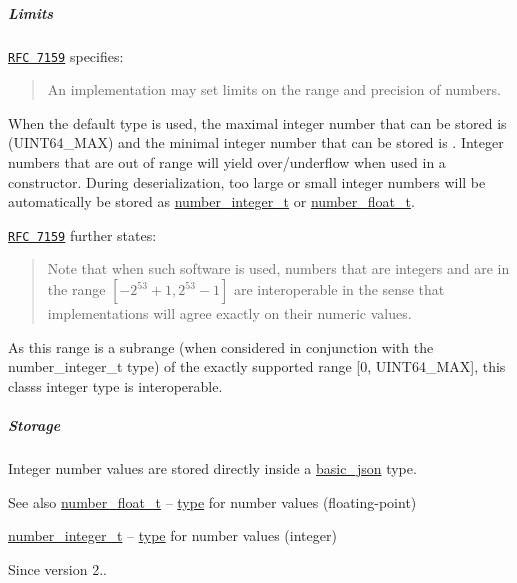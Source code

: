\subparagraph*{Limits}

\href{http://rfc7159.net/rfc7159}{\tt R\+FC 7159} specifies\+: \begin{quote}
An implementation may set limits on the range and precision of numbers. \end{quote}


When the default type is used, the maximal integer number that can be stored is {} (U\+I\+N\+T64\+\_\+\+M\+AX) and the minimal integer number that can be stored is {}. Integer numbers that are out of range will yield over/underflow when used in a constructor. During deserialization, too large or small integer numbers will be automatically be stored as \hyperlink{classnlohmann_1_1basic__json_a11e390944da90db83089eb2426a749d3}{number\+\_\+integer\+\_\+t} or \hyperlink{classnlohmann_1_1basic__json_a5b8abaebd922d82d69756327c0c347e6}{number\+\_\+float\+\_\+t}.

\href{http://rfc7159.net/rfc7159}{\tt R\+FC 7159} further states\+: \begin{quote}
Note that when such software is used, numbers that are integers and are in the range $[-2^{53}+1, 2^{53}-1]$ are interoperable in the sense that implementations will agree exactly on their numeric values. \end{quote}


As this range is a subrange (when considered in conjunction with the number\+\_\+integer\+\_\+t type) of the exactly supported range \mbox{[}0, U\+I\+N\+T64\+\_\+\+M\+AX\mbox{]}, this class\textquotesingle{}s integer type is interoperable.

\subparagraph*{Storage}

Integer number values are stored directly inside a \hyperlink{classnlohmann_1_1basic__json}{basic\+\_\+json} type.

\begin{DoxySeeAlso}{See also}
\hyperlink{classnlohmann_1_1basic__json_a5b8abaebd922d82d69756327c0c347e6}{number\+\_\+float\+\_\+t} -- \hyperlink{classnlohmann_1_1basic__json_a5b7c4b35a0ad9f97474912a08965d7ad}{type} for number values (floating-\/point) 

\hyperlink{classnlohmann_1_1basic__json_a11e390944da90db83089eb2426a749d3}{number\+\_\+integer\+\_\+t} -- \hyperlink{classnlohmann_1_1basic__json_a5b7c4b35a0ad9f97474912a08965d7ad}{type} for number values (integer)
\end{DoxySeeAlso}
\begin{DoxySince}{Since}
version 2.. 
\end{DoxySince}
